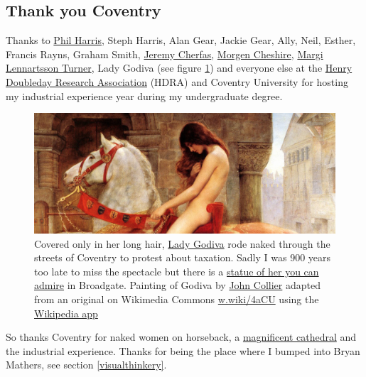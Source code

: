 \documentclass[
]{book}
\begin{document}
\hypertarget{coventry}{%
\subsection{Thank you Coventry}\label{coventry}}

Thanks to \href{https://www.coventry.ac.uk/research/research-people/professor-phil-harris/}{Phil Harris}, Steph Harris, Alan Gear, Jackie Gear, Ally, Neil, Esther, Francis Rayns, Graham Smith, \href{https://www.jeremycherfas.net/}{Jeremy Cherfas}, \href{https://cheshirenonprofitlaw.com/people/team/morgen/}{Morgen Cheshire}, \href{https://pureportal.coventry.ac.uk/en/persons/margi-lennartsson-turner}{Margi Lennartsson Turner}, Lady Godiva (see figure \ref{fig:coventry-fig}) and everyone else at the \href{https://en.wikipedia.org/wiki/Henry_Doubleday_Research_Association}{Henry Doubleday Research Association} (HDRA) and Coventry University for hosting my industrial experience year during my undergraduate degree.

\begin{figure}

{\centering \includegraphics[width=1\linewidth]{images/godiva} 

}

\caption{Covered only in her long hair, \href{https://en.wikipedia.org/wiki/Lady_Godiva}{Lady Godiva} rode naked through the streets of Coventry to protest about taxation. Sadly I was 900 years too late to miss the spectacle but there is a \href{https://w.wiki/4aD4}{statue of her you can admire} in Broadgate. Painting of Godiva by \href{https://en.wikipedia.org/wiki/John_Collier_(painter)}{John Collier} adapted from an original on Wikimedia Commons \href{https://w.wiki/4aCU}{w.wiki/4aCU} using the \href{https://apps.apple.com/us/app/wikipedia/id324715238}{Wikipedia app}}\label{fig:coventry-fig}
\end{figure}



So thanks Coventry for naked women on horseback, a \href{https://en.wikipedia.org/wiki/Coventry_Cathedral}{magnificent cathedral} and the industrial experience. Thanks for being the place where I bumped into Bryan Mathers, see section \ref{visualthinkery}. 🙏
\end{document}
